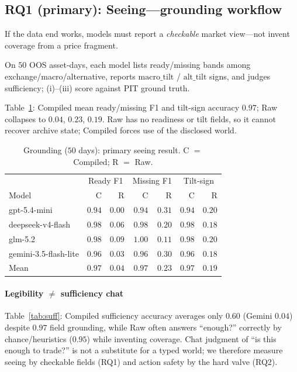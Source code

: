 \documentclass[sigconf,anonymous]{acmart}
\theoremstyle{acmdefinition}%
\theoremstyle{acmplain}%
\begin{document}
\subsection{RQ1 (primary): Seeing---grounding workflow}
\label{sec:grounding}
If the data end works, models must report a \emph{checkable} market view---not invent coverage from a price fragment.

On \(50\) OOS asset-days, each model lists ready/missing bands among exchange/macro/alternative, reports \(\mathrm{macro\_tilt}\) / \(\mathrm{alt\_tilt}\) signs, and judges sufficiency; (i)--(iii) score against PIT ground truth.

Table~\ref{tab:grounding}: Compiled mean ready/missing F1 and tilt-sign accuracy \(0.97\); Raw collapses to \(0.04\), \(0.23\), \(0.19\).
Raw has no readiness or tilt fields, so it cannot recover archive state; Compiled forces use of the disclosed world.

\begin{table}[t]
  \caption{Grounding ($50$ days): primary seeing result. C $=$ Compiled; R $=$ Raw.}
  \label{tab:grounding}
  \small
  \begin{tabular}{lrrrrrr}
    \toprule
    & \multicolumn{2}{c}{Ready F1} & \multicolumn{2}{c}{Missing F1} & \multicolumn{2}{c}{Tilt-sign} \\
    Model & C & R & C & R & C & R \\
    \midrule
    gpt-5.4-mini & $0.94$ & $0.00$ & $0.94$ & $0.31$ & $0.94$ & $0.20$ \\
    deepseek-v4-flash & $0.98$ & $0.06$ & $0.98$ & $0.20$ & $0.98$ & $0.18$ \\
    glm-5.2 & $0.98$ & $0.09$ & $1.00$ & $0.11$ & $0.98$ & $0.20$ \\
    gemini-3.5-flash-lite & $0.96$ & $0.03$ & $0.96$ & $0.30$ & $0.96$ & $0.18$ \\
    \midrule
    Mean & $0.97$ & $0.04$ & $0.97$ & $0.23$ & $0.97$ & $0.19$ \\
    \bottomrule
  \end{tabular}
\end{table}

\paragraph{Legibility \(\neq\) sufficiency chat}
Table~\ref{tab:suff}: Compiled sufficiency accuracy averages only \(0.60\) (Gemini \(0.04\)) despite \(0.97\) field grounding, while Raw often answers ``enough?'' correctly by chance/heuristics (\(0.95\)) while inventing coverage.
Chat judgment of ``is this enough to trade?'' is not a substitute for a typed world; we therefore measure seeing by checkable fields (RQ1) and action safety by the hard valve (RQ2).
\end{document}
